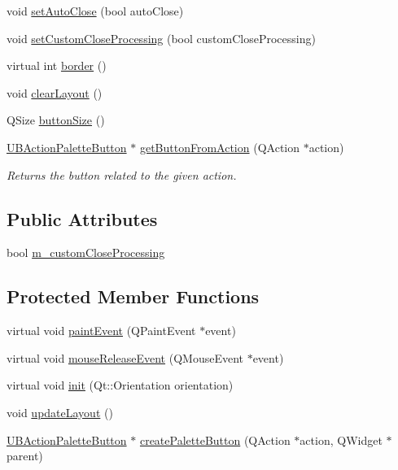 \begin{DoxyCompactItemize}
void \hyperlink{class_u_b_action_palette_aa84eda39a74ecc51ee3ea740437c349f}{set\-Auto\-Close} (bool auto\-Close)
\item 
void \hyperlink{class_u_b_action_palette_a48a5bb2c2e77378772b9ef40c1fce7ba}{set\-Custom\-Close\-Processing} (bool custom\-Close\-Processing)
\item 
virtual int \hyperlink{class_u_b_action_palette_acb5a31a19bf700a33de7414e890c7231}{border} ()
\item 
void \hyperlink{class_u_b_action_palette_aba0381d16879caa1c9001f8591330e7c}{clear\-Layout} ()
\item 
Q\-Size \hyperlink{class_u_b_action_palette_a749bfb30aa174b28d86db8732f175f21}{button\-Size} ()
\item 
\hyperlink{class_u_b_action_palette_button}{U\-B\-Action\-Palette\-Button} $\ast$ \hyperlink{class_u_b_action_palette_a1851d2188e15d4413a148e25d2263b9d}{get\-Button\-From\-Action} (Q\-Action $\ast$action)
\begin{DoxyCompactList}\small\item\em Returns the button related to the given action. \end{DoxyCompactList}\end{DoxyCompactItemize}
\subsection*{Public Attributes}
\begin{DoxyCompactItemize}
\item 
bool \hyperlink{class_u_b_action_palette_a7607d893e16a6623a3bc10a049acbdc0}{m\-\_\-custom\-Close\-Processing}
\end{DoxyCompactItemize}
\subsection*{Protected Member Functions}
\begin{DoxyCompactItemize}
\item 
virtual void \hyperlink{class_u_b_action_palette_a70b2e19272054aba6cf9ea8ddfd0955b}{paint\-Event} (Q\-Paint\-Event $\ast$event)
\item 
virtual void \hyperlink{class_u_b_action_palette_ac2780ac183ab9614a28199e252f0d447}{mouse\-Release\-Event} (Q\-Mouse\-Event $\ast$event)
\item 
virtual void \hyperlink{class_u_b_action_palette_a2c6dff972f995d1f55bacbbc83bb1c2e}{init} (Qt\-::\-Orientation orientation)
\item 
void \hyperlink{class_u_b_action_palette_ab1b868f86b28c9896cc12bba932fecc2}{update\-Layout} ()
\item 
\hyperlink{class_u_b_action_palette_button}{U\-B\-Action\-Palette\-Button} $\ast$ \hyperlink{class_u_b_action_palette_af55ffe5dc6a804711b1ae31e76cfedb3}{create\-Palette\-Button} (Q\-Action $\ast$action, Q\-Widget $\ast$parent)
\end{DoxyCompactItemize}
